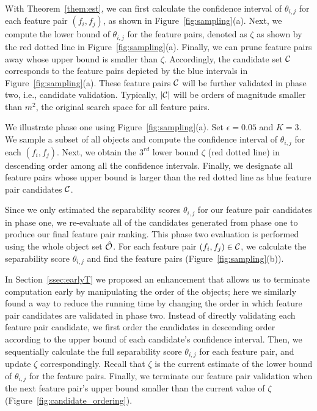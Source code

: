 With Theorem~\ref{them:est}, we can first calculate the confidence interval of $\theta_{i,j}$ for each feature pair $(f_i,f_j)$, as shown in Figure~\ref{fig:sampling}(a). Next, we compute the lower bound of $\theta_{i,j}$ for the \topk feature pairs, denoted as $\zeta$ as shown by the red dotted line in Figure~\ref{fig:sampling}(a). Finally, we can prune feature pairs away whose upper bound is smaller than $\zeta$. Accordingly, the candidate set ${\mathcal{C}}$ corresponds to the feature pairs depicted by the blue intervals in Figure~\ref{fig:sampling}(a). These feature pairs ${\mathcal{C}}$ will be further validated in phase two, i.e., candidate validation. Typically, $|{\mathcal{C}}|$ will be orders of magnitude smaller than $m^2$, the original search space for all feature pairs.

\begin{example}
We illustrate phase one using Figure~\ref{fig:sampling}(a). Set $\epsilon = 0.05$ and $K=3$. We sample a subset of all objects and compute the confidence interval of $\theta_{i,j}$ for each $(f_i,f_j)$. Next, we obtain the $3^{rd}$ lower bound $\zeta$ (red dotted line) in descending order among all the confidence intervals. Finally, we designate all feature pairs whose upper bound is larger than the red dotted line as blue feature pair candidates ${\mathcal{C}}$.
\end{example}

Since we only estimated the separability scores $\theta_{i,j}$ for our feature pair candidates in phase one, we re-evaluate all of the candidates generated from phase one to produce our final feature pair ranking. This phase two evaluation is performed using the whole object set $\hat{{\mathcal{O}}}$. 
 For each feature pair $(f_i,f_j)\in {\mathcal{C}}$, we calculate the separability score $\theta_{i,j}$ and find the \topk feature pairs (Figure~\ref{fig:sampling}(b)).

In Section~\ref{ssec:earlyT} we proposed an enhancement 
that allows us to terminate computation early by 
manipulating the order of the objects; 
here we similarly found a way to reduce the running 
time by changing the order in which feature pair candidates 
are validated in phase two. 
Instead of directly validating each feature pair candidate, 
we first order the candidates in descending order according to the upper bound of each candidate's confidence interval. 
Then, we sequentially calculate the full separability 
score $\theta_{i,j}$ for each feature pair, and update $\zeta$ correspondingly. 
Recall that $\zeta$ is the current estimate of the lower bound of $\theta_{i,j}$ for the \topk feature pairs. Finally, we terminate our feature 
pair validation when the next feature pair's upper bound smaller than the current value of $\zeta$ (Figure~\ref{fig:candidate_ordering}).

